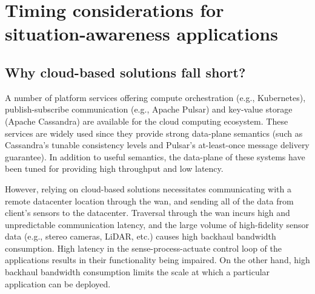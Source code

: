 \section{Timing considerations for situation-awareness applications}
\subsection{Why cloud-based solutions fall short?}
A number of platform services offering compute orchestration (e.g., Kubernetes), publish-subscribe communication (e.g., Apache Pulsar) and key-value storage (Apache Cassandra) are available for the cloud computing ecosystem. These services are widely used since they provide strong data-plane semantics (such as Cassandra's tunable consistency levels and Pulsar's at-least-once message delivery guarantee). In addition to useful semantics, the data-plane of these systems have been tuned for providing high throughput and low latency. 
\par However, relying on cloud-based solutions necessitates communicating with a remote datacenter location through the \gls{wan}, and sending all of the data from client's sensors to the datacenter. Traversal through the \gls{wan} incurs high and unpredictable communication latency, and the large volume of high-fidelity sensor data (e.g., stereo cameras, LiDAR, etc.) causes high backhaul bandwidth consumption. High latency in the sense-process-actuate control loop of the applications results in their functionality being impaired. On the other hand, high backhaul bandwidth consumption limits the scale at which a particular application can be deployed.

